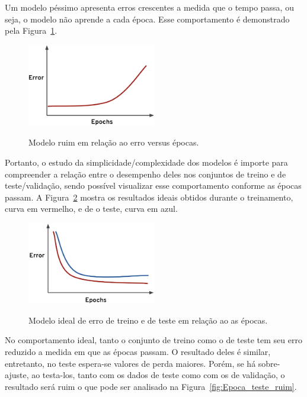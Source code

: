             Um modelo péssimo apresenta erros crescentes a medida que o tempo passa, ou seja, o modelo não aprende a cada época. Esse comportamento é demonstrado pela Figura~\ref{fig:modelo_ruim}.
            
            \begin{figure}[H]
                \centering
                \caption{Modelo ruim em relação ao erro versus épocas.}
                \includegraphics[width=0.5\textwidth]{fig/2-fundamentacao/overfitting/modelo_ruim.png}
                \label{fig:modelo_ruim}
            \end{figure}
            
            Portanto, o estudo da simplicidade/complexidade dos modelos é importe para compreender a relação entre o desempenho deles nos conjuntos de treino e de teste/validação, sendo possível visualizar esse comportamento conforme as épocas passam. A Figura~\ref{fig:epocas_treino_teste} mostra os resultados ideais obtidos durante o treinamento, curva em vermelho, e de o teste, curva em azul.
            
            \begin{figure}[H]
                \centering
                \caption{Modelo ideal de erro de treino e de teste em relação ao as épocas.}
                \includegraphics[width=0.5\textwidth]{fig/2-fundamentacao/overfitting/epocas_treino_teste.png}
                \label{fig:epocas_treino_teste}
            \end{figure}
            
            No comportamento ideal, tanto o conjunto de treino como o de teste tem seu erro reduzido a medida em que as épocas passam. O resultado deles é similar, entretanto, no teste espera-se valores de perda maiores. Porém, se há sobre-ajuste, ao testa-los, tanto com os dados de teste como com os de validação, o resultado será ruim o que pode ser analisado na Figura~\ref{fig:Epoca_teste_ruim}.
            
